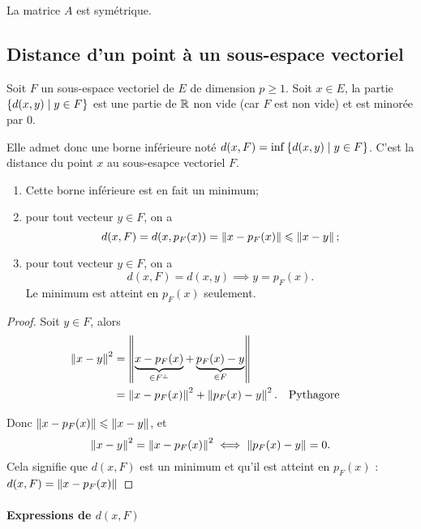 La matrice \(A\) est symétrique.

\subsection{Distance d'un point à un sous-espace vectoriel}

Soit \(F\) un sous-espace vectoriel de \(E\) de dimension \(p \geqslant 1\). 
Soit \(x \in E\), la partie \(\left\{d(x,y)\mathrel{}\middle|\mathrel{}y \in F\right\}\) est une partie de 
\(\mathbb{R}\) non vide (car \(F\) est non vide) et est minorée par \(0\).

Elle admet donc une borne inférieure noté \(d(x,F)=\inf\left\{d(x,y)\mathrel{}\middle|\mathrel{}y \in 
F\right\}\). C'est la distance du point \(x\) au sous-esapce vectoriel \(F\).

\begin{theo}
  \begin{enumerate}
    \item Cette borne inférieure est en fait un minimum;
    \item pour tout vecteur \(y \in F\), on a
      \begin{equation}
        d(x,F) = d(x,p_F(x)) = \left\lVert x-p_F(x)\right\rVert \leqslant \left\lVert x-y\right\rVert;    
      \end{equation}
    \item pour tout vecteur \(y \in F\), on a
      \begin{equation}
        d(x,F) = d(x,y) \implies y=p_F(x).
      \end{equation}
      Le minimum est atteint en \(p_F(x)\) seulement.
  \end{enumerate}
\end{theo}
\begin{proof}
  Soit \(y \in F\), alors
  \begin{align*}
    \left\lVert x-y\right\rVert^2 &=\left\lVert\underbrace{x-p_F(x)}_{\in F^\perp} + 
    \underbrace{p_F(x)-y}_{\in F}\right\rVert\\
    &=\left\lVert x-p_F(x)\right\rVert^2 + \left\lVert p_F(x)-y\right\rVert^2. && \text{Pythagore}
  \end{align*}

  Donc \(\left\lVert x-p_F(x)\right\rVert \leqslant \left\lVert x-y\right\rVert\), et
  \begin{equation}
    \left\lVert x-y\right\rVert^2 = \left\lVert x-p_F(x)\right\rVert^2 \iff  \left\lVert p_F(x)-y\right\rVert=0.
  \end{equation}
  Cela signifie que \(d(x,F)\) est un minimum et qu'il est atteint en 
  \(p_F(x)\) : \(d(x,F)=\left\lVert x-p_F(x)\right\rVert\)
\end{proof}

\paragraph{Expressions de \(d(x,F)\)}

